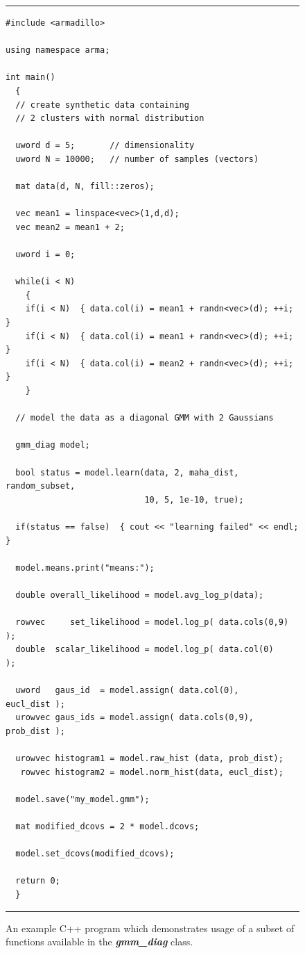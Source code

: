\documentclass[10pt,a4paper]{article}
\begin{document}
\begin{figure}[!h]
\vspace{1ex}
\hrule
\vspace{1ex}
\centering
\begin{adjustbox}{minipage=\columnwidth,scale={1}{1.1}}
\begin{Verbatim}[fontsize=\footnotesize]
#include <armadillo>

using namespace arma;

int main()
  {
  // create synthetic data containing
  // 2 clusters with normal distribution
  
  uword d = 5;       // dimensionality
  uword N = 10000;   // number of samples (vectors)
  
  mat data(d, N, fill::zeros);
  
  vec mean1 = linspace<vec>(1,d,d);
  vec mean2 = mean1 + 2;
  
  uword i = 0;
  
  while(i < N)
    {
    if(i < N)  { data.col(i) = mean1 + randn<vec>(d); ++i; }
    if(i < N)  { data.col(i) = mean1 + randn<vec>(d); ++i; }
    if(i < N)  { data.col(i) = mean2 + randn<vec>(d); ++i; }
    }
  
  // model the data as a diagonal GMM with 2 Gaussians
  
  gmm_diag model;
  
  bool status = model.learn(data, 2, maha_dist, random_subset,
                            10, 5, 1e-10, true);
  
  if(status == false)  { cout << "learning failed" << endl; }
  
  model.means.print("means:");
  
  double overall_likelihood = model.avg_log_p(data);
  
  rowvec     set_likelihood = model.log_p( data.cols(0,9) );
  double  scalar_likelihood = model.log_p( data.col(0)    );
  
  uword   gaus_id  = model.assign( data.col(0),    eucl_dist );
  urowvec gaus_ids = model.assign( data.cols(0,9), prob_dist );
  
  urowvec histogram1 = model.raw_hist (data, prob_dist);
   rowvec histogram2 = model.norm_hist(data, eucl_dist);
  
  model.save("my_model.gmm");
  
  mat modified_dcovs = 2 * model.dcovs;
  
  model.set_dcovs(modified_dcovs);
  
  return 0;
  }

\end{Verbatim}
\end{adjustbox}
\hrule
\vspace{0.5ex}
\caption
  {
  An example C++ program which demonstrates usage of a subset of functions available in the {\it\bfseries gmm\_diag} class.
  }
\label{fig:example_usage}
\end{figure}
\end{document}
